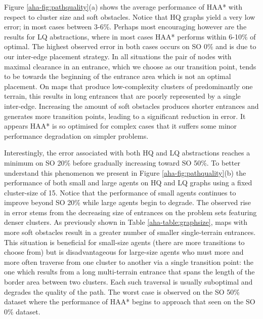 \par \indent
Figure \ref{aha-fig:pathquality}(a) shows the average performance of HAA* with respect to cluster size and soft obstacles.  
Notice that HQ graphs yield a very low error; in most cases between 3-6\%. 
Perhaps most encouraging however are the results for LQ abstractions, where in most cases HAA* performs within 6-10\% of optimal. 
The highest observed error in both cases occurs on SO 0\% and is due to our inter-edge placement strategy.
In all situations the pair of nodes with maximal clearance in an entrance, which we choose as our transition point, tends to be towards the beginning of the entrance area which is not an optimal placement.
On maps that produce low-complexity clusters of predominantly one terrain, this results in long entrances that are poorly represented by a single inter-edge.
Increasing the amount of soft obstacles produces shorter entrances and generates more transition points, leading to a significant reduction in error. 
It appears HAA* is so optimised for complex cases that it suffers some minor performance degradation on simpler problems. 
\par \indent
Interestingly, the error associated with both HQ and LQ abstractions reaches a minimum on SO 20\% before gradually increasing toward SO 50\%. 
To better understand this phenomenon we present in Figure \ref{aha-fig:pathquality}(b) the performance of both small and large agents on HQ and LQ graphs using a fixed cluster-size of 15.
Notice that the performance of small agents continues to improve beyond SO 20\% while large agents begin to degrade.
The observed rise in error stems from the decreasing size of entrances on the problem sets featuring denser clusters. 
As previously shown in Table \ref{aha-table:graphsize}, maps with more soft obstacles result in a greater number of smaller single-terrain entrances. 
This situation is beneficial for small-size agents (there are more transitions to choose from) but is disadvantageous for large-size agents who must more and more often traverse from one cluster to another via a single transition point: the one which results from a long multi-terrain entrance that spans the length of the border area between two clusters. 
Each such traversal is usually suboptimal and degrades the quality of the path. 
The worst case is observed on the SO 50\% dataset where the performance of HAA* begins to approach that seen on the SO 0\% dataset.

